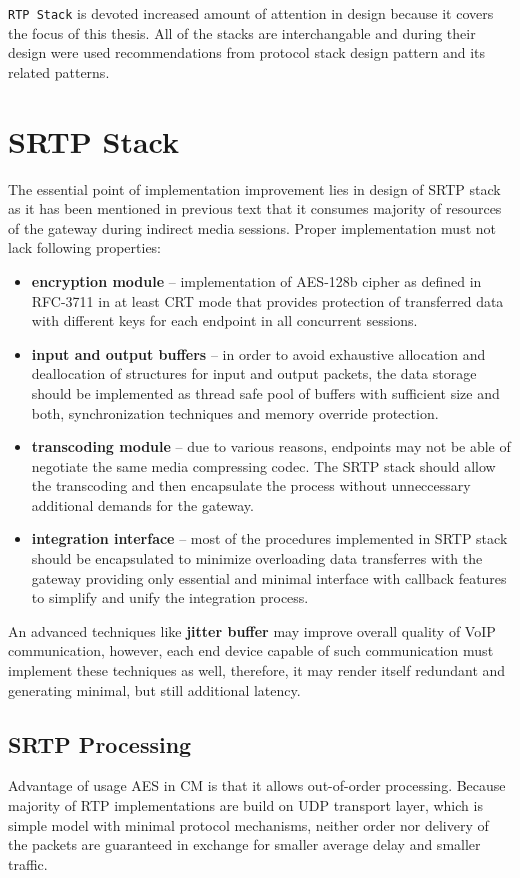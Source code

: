 \texttt{RTP Stack} is devoted increased amount of attention in design because it 
covers the focus of this thesis. All of the stacks are interchangable and during 
their design were used recommendations from protocol stack design pattern and 
its related patterns.


\section{SRTP Stack}
The essential point of implementation improvement lies in design of SRTP stack 
as it has been mentioned in previous text that it consumes majority of resources 
of the gateway during indirect media sessions. Proper implementation must not lack following properties:

\begin{itemize}
\item \textbf{encryption module} -- implementation of AES-128b cipher as defined
in RFC-3711 \cite{rfc3711} in at least CRT mode that provides protection of transferred
data with different keys for each endpoint in all concurrent sessions.
\item \textbf{input and output buffers} -- in order to avoid exhaustive allocation
and deallocation of structures for input and output packets, the data storage should
be implemented as thread safe pool of buffers  with sufficient size and both, 
synchronization techniques and memory override protection.
\item \textbf{transcoding module} -- due to various reasons, endpoints may not be
able of negotiate the same media compressing codec. The SRTP stack should allow
the transcoding and then encapsulate the process without unneccessary additional
demands for the gateway.
\item \textbf{integration interface} -- most of the procedures implemented in
SRTP stack should be encapsulated to minimize overloading data transferres with
the gateway providing only essential and minimal interface with callback
features to simplify and unify the integration process.
\end{itemize}

An advanced techniques like \textbf{jitter buffer} may improve overall quality
of VoIP communication, however, each end device capable of such communication must
implement these techniques as well, therefore, it may render itself redundant 
and generating minimal, but still additional latency.

\subsection{SRTP Processing}
Advantage of usage AES in CM is that it allows out-of-order processing. Because
majority of RTP implementations are build on UDP transport layer, which is 
simple model with minimal protocol mechanisms, neither order nor delivery of the
packets are guaranteed in exchange for smaller average delay and smaller 
traffic. 

